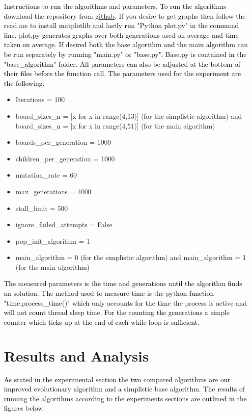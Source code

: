 \documentclass{scrartcl}
\begin{document}
\textcolor{black}{Instructions to run the algorithms and parameters. To run the algorithms download the repository from \href{https://github.com/Sneakycloud/N-queens\_problem\_Evolutionary\_Alg/tree/main}{github}. If you desire to get graphs then follow the read.me to install matplotlib and lastly run "Python plot.py" in the command line. plot.py generates graphs over both generations used on average and time taken on average. If desired both the base algorithm and the main algorithm can be run separately by running "main.py" or "base.py". Base.py is contained in the "base\_algorithm" folder. All parameters can also be adjusted at the bottom of their files before the function call. The parameters used for the experiment are the following.}
\begin{itemize}
	\item Iterations = 100
	\item board\_sizes\_n = [x for x in range(4,13)] (for the simplistic algorithm) and board\_sizes\_n = [x for x in range(4,51)] (for the main algorithm)
	\item boards\_per\_generation = 1000
	\item children\_per\_generation = 1000
	\item mutation\_rate = 60
	\item max\_generations = 4000
	\item stall\_limit = 500
	\item ignore\_failed\_attempts = False
	\item pop\_init\_algorithm = 1
	\item main\_algorithm = 0 (for the simplistic algorithm) and main\_algorithm = 1 (for the main algorithm)
\end{itemize}

\textcolor{black}{The measured parameters is the time and generations until the algorithm finds an solution. The method used to measure time is the python function "time.process\_time()" which only accounts for the time the process is active and will not count thread sleep time. For the counting the generations a simple counter which ticks up at the end of each while loop is sufficient.}

\section{Results and Analysis}
\label{sec:results-analysis}
\textcolor{black}{As stated in the experimental section the two compared algorithms are our improved evolutionary algorithm and a simplistic base algorithm.  The results of running the algorithms according to the experiments sections are outlined in the figures below.}
\end{document}
